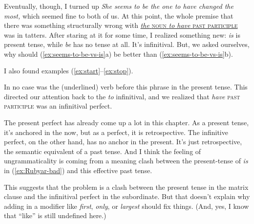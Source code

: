 Eventually, though, I turned up \textit{She seems to be the one to have changed the most,} which seemed fine to both of us. At this point, the whole premise that there was something structurally wrong with \uline{\textit{the} \textsc{noun} \textit{to have} \textsc{past participle}} was in tatters. After staring at it for some time, I realized something new: \textit{is} is present tense, while \textit{be} has no tense at all. It's infinitival. But, we asked ourselves, why should (\ref{ex:seems-to-be-vs-is}a) be better than (\ref{ex:seems-to-be-vs-is}b).

\ea \label{ex:seems-to-be-vs-is}
    \z
\z

\noindent I also found examples (\ref{ex:start}--\ref{ex:stop}).

\label{ex:start}\z
{}\z
{}\z
{}\z
{}\z
{}\label{ex:stop}\z

In no case was the (underlined) verb before this phrase in the present tense. This directed our attention back to the \textit{to} infinitival, and we realized that \textit{have} \textsc{past participle} was an infinitival perfect.

The present perfect has already come up a lot in this chapter. As a present tense, it's anchored in the now, but as a perfect, it is retrospective. The infinitive perfect, on the other hand, has no anchor in the present. It's just retrospective, the semantic equivalent of a past tense. And I think the feeling of ungrammaticality is coming from a meaning clash between the present-tense of \textit{is} in (\ref{ex:Rubyar-bad}) and this effective past tense.

This suggests that the problem is a clash between the present tense in the matrix clause and the infinitival perfect in the subordinate. But that doesn't explain why adding in a modifier like \textit{first}, \textit{only}, or \textit{largest} should fix things. (And, yes, I know that ``like'' is still undefined here.)

